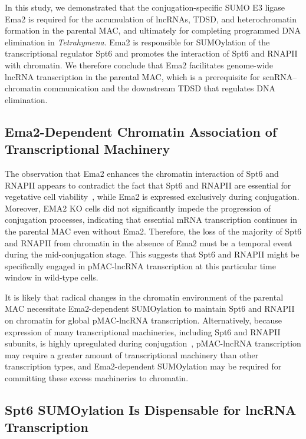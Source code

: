 \documentclass[12pt]{article}
\begin{document}
In this study, we demonstrated that the conjugation-specific SUMO E3 ligase Ema2 is required for the accumulation of lncRNAs, TDSD, and heterochromatin formation in the parental MAC, and ultimately for completing programmed DNA elimination in \textit{Tetrahymena}.
Ema2 is responsible for SUMOylation of the transcriptional regulator Spt6 and promotes the interaction of Spt6 and RNAPII with chromatin.
We therefore conclude that Ema2 facilitates genome-wide lncRNA transcription in the parental MAC, which is a prerequisite for scnRNA--chromatin communication and the downstream TDSD that regulates DNA elimination.

\subsection{Ema2-Dependent Chromatin Association of Transcriptional Machinery}

The observation that Ema2 enhances the chromatin interaction of Spt6 and RNAPII appears to contradict the fact that Spt6 and RNAPII are essential for vegetative cell viability~\citep{Mochizuki2004b}, while Ema2 is expressed exclusively during conjugation.
Moreover, EMA2 KO cells did not significantly impede the progression of conjugation processes, indicating that essential mRNA transcription continues in the parental MAC even without Ema2.
Therefore, the loss of the majority of Spt6 and RNAPII from chromatin in the absence of Ema2 must be a temporal event during the mid-conjugation stage.
This suggests that Spt6 and RNAPII might be specifically engaged in pMAC-lncRNA transcription at this particular time window in wild-type cells.

It is likely that radical changes in the chromatin environment of the parental MAC necessitate Ema2-dependent SUMOylation to maintain Spt6 and RNAPII on chromatin for global pMAC-lncRNA transcription.
Alternatively, because expression of many transcriptional machineries, including Spt6 and RNAPII subunits, is highly upregulated during conjugation~\citep{Miao2009, Xiong2012, Mochizuki2004b}, pMAC-lncRNA transcription may require a greater amount of transcriptional machinery than other transcription types, and Ema2-dependent SUMOylation may be required for committing these excess machineries to chromatin.

\subsection{Spt6 SUMOylation Is Dispensable for lncRNA Transcription}
\end{document}
